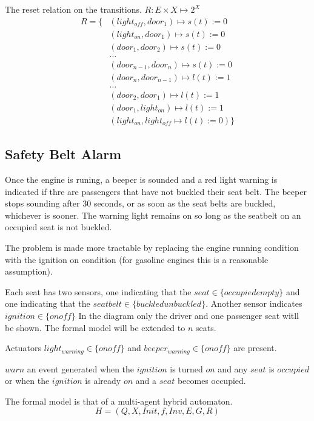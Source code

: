 \documentclass{article}
\begin{document}
The reset relation on the transitions.
$R: E \times X \mapsto 2^X$
\begin{align}
R = \{ & ( light_{off}, door_1 ) \mapsto s(t) := 0 \\
    & ( light_{on}, door_1 ) \mapsto  s(t) := 0 \\
    & ( door_1, door_2 ) \mapsto  s(t) := 0 \\
    & \ldots \\
    & ( door_{n-1}, door_n ) \mapsto  s(t) := 0 \\
    & ( door_n, door_{n-1} ) \mapsto l(t) := 1 \\
    & \ldots \\
    & ( door_2, door_1 ) \mapsto l(t) := 1 \\
    & ( door_1, light_{on} ) \mapsto l(t) := 1 \\
    & ( light_{on}, light_{off} \mapsto l(t) := 0 ) \}
\end{align}

\subsection{Safety Belt Alarm}
Once the engine is runing,
a beeper is sounded and
a red light warning is indicated if thre are
passengers that have not buckled their seat belt.
The beeper stops sounding after 30 seconds, or
as soon as the seat belts are buckled,
whichever is sooner.
The warning light remains on so long as the
seatbelt on an occupied seat is not buckled.

The problem is made more tractable by
replacing the engine running condition with
the ignition on condition (for gasoline engines
this is a reasonable assumption).


Each seat has two sensors, one indicating that
the $seat \in \{occupied empty\}$
and one indicating that the
$seatbelt \in \{buckled unbuckled\}$.
Another sensor indicates
$ignition \in \{on off\}$
In the diagram only the driver and one passenger
seat witll be shown.
The formal model will be extended to $n$ seats.

Actuators $light_{warning} \in \{on off\}$
and $beeper_{warning} \in \{on off\}$ are present.

$warn$ \is an event generated when the $ignition$ is
turned $on$ and any $seat$ is $occupied$ or when
the $ignition$ is already $on$ and a $seat$ becomes
occupied.


The formal model is that of a multi-agent hybrid automaton.
\begin{equation}
H = (Q, X, Init, f, Inv, E, G, R)
\end{equation}
\end{document}
